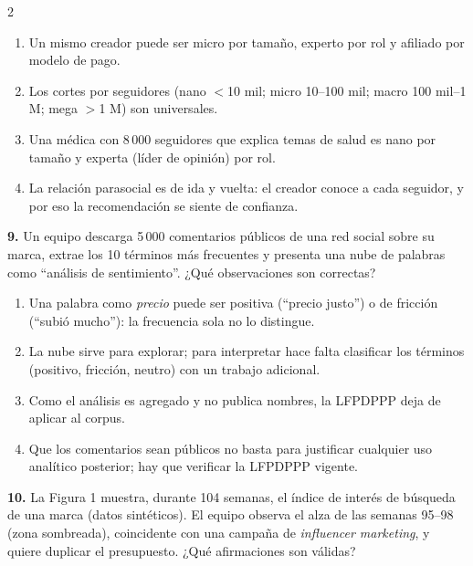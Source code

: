 \documentclass[10pt,letterpaper]{article}
\newcommand{\cas}{\framebox[1.0em]{\rule{0pt}{1.05ex}}}
\begin{document}
\begin{multicols}{2}
\begin{minipage}[t]{\columnwidth}
\begin{enumerate}[label=\cas\ \alph*),leftmargin=2.3em,itemsep=1.2pt,topsep=1pt,parsep=0pt,partopsep=0pt]
\item Un mismo creador puede ser micro por tamaño, experto por rol y afiliado por modelo de pago.
\item Los cortes por seguidores (nano $<$10 mil; micro 10--100 mil; macro 100 mil--1 M; mega $>$1 M) son universales.
\item Una médica con 8\,000 seguidores que explica temas de salud es nano por tamaño y experta (líder de opinión) por rol.
\item La relación parasocial es de ida y vuelta: el creador conoce a cada seguidor, y por eso la recomendación se siente de confianza.
\end{enumerate}\end{minipage}\par\vspace{3pt}
\begin{minipage}[t]{\columnwidth}\noindent\textbf{9.} Un equipo descarga 5\,000 comentarios públicos de una red social sobre su marca, extrae los 10 términos más frecuentes y presenta una nube de palabras como \enquote{análisis de sentimiento}. ¿Qué observaciones son correctas?
\vspace{1pt}\begin{enumerate}[label=\cas\ \alph*),leftmargin=2.3em,itemsep=1.2pt,topsep=1pt,parsep=0pt,partopsep=0pt]
\item Una palabra como \textit{precio} puede ser positiva (\enquote{precio justo}) o de fricción (\enquote{subió mucho}): la frecuencia sola no lo distingue.
\item La nube sirve para explorar; para interpretar hace falta clasificar los términos (positivo, fricción, neutro) con un trabajo adicional.
\item Como el análisis es agregado y no publica nombres, la LFPDPPP deja de aplicar al corpus.
\item Que los comentarios sean públicos no basta para justificar cualquier uso analítico posterior; hay que verificar la LFPDPPP vigente.
\end{enumerate}\end{minipage}\par\vspace{3pt}
\begin{minipage}[t]{\columnwidth}\noindent\textbf{10.} La Figura 1 muestra, durante 104 semanas, el índice de interés de búsqueda de una marca (datos sintéticos). El equipo observa el alza de las semanas 95--98 (zona sombreada), coincidente con una campaña de \textit{influencer marketing}, y quiere duplicar el presupuesto. ¿Qué afirmaciones son válidas?

\end{minipage}
\end{multicols}
\end{document}
